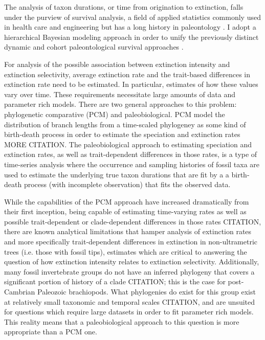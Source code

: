\documentclass{article}
\begin{document}
The analysis of taxon durations, or time from origination to extinction, falls under the purview of survival analysis, a field of applied statistics commonly used in health care and engineering \citep{Klein2003} but has a long history in paleontology \citep{Simpson1944,Simpson1953,VanValen1973,VanValen1979,Smits2015,Crampton2016}. I adopt a hierarchical Bayesian modeling approach \citep{Gelman2007,Gelman2013d} in order to unify the previously distinct dynamic and cohort paleontological survival approaches \citep{VanValen1973,VanValen1979,Raup1978,Raup1975,Foote1988,Baumiller1993,Simpson2006,Crampton2016,Ezard2012b}. 

For analysis of the possible association between extinction intensity and extinction selectivity, average extinction rate and the trait-based differences in extinction rate need to be estimated. In particular, estimates of how these values vary over time. These requirements necessitate large amounts of data and parameter rich models. There are two general approaches to this problem: phylogenetic comparative (PCM) and paleobiological. PCM model the distribution of branch lengths from a time-scaled phylogeney as some kind of birth-death process in order to estimate the speciation and extinction rates \citep{Maddison2007,Fitzjohn2010,Goldberg2011a,Goldberg2005,Rabosky2013,Stadler2013b,Stadler2011,Stadler2013a} MORE CITATION. The paleobiological approach to estimating speciation and extinction rates, as well as trait-dependent differences in those rates, is a type of time-series analysis where the occurrence and sampling histories of fossil taxa are used to estimate the underlying true taxon durations that are fit by a a birth-death process (with incomplete observation) that fits the observed data.

While the capabilities of the PCM approach have increased dramatically from their first inception, being capable of estimating time-varying rates as well as possible trait-dependent or clade-dependent differences in those rates CITATION, there are known analytical limitations that hamper analysis of extinction rates and more specifically trait-dependent differences in extinction in non-ultrametric trees (i.e. those with fossil tips), estimates which are critical to answering the question of how extinction intensity relates to extinction selectivity. Additionally, many fossil invertebrate groups do not have an inferred phylogeny that covers a significant portion of history of a clade CITATION; this is the case for post-Cambrian Paleozoic brachiopods. What phylogenies do exist for this group exist at relatively small taxonomic and temporal scales CITATION, and are unsuited for questions which require large datasets in order to fit parameter rich models. This reality means that a paleobiological approach to this question is more appropriate than a PCM one.
\end{document}
